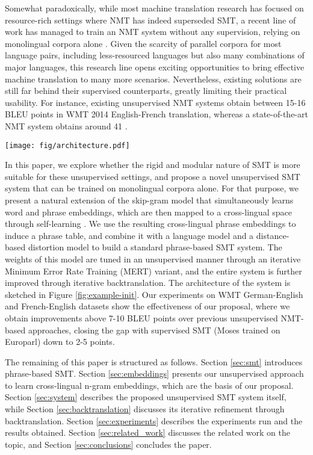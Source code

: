 \documentclass[11pt,a4paper]{article}
\begin{document}
Somewhat paradoxically, while most machine translation research has focused on resource-rich settings where NMT has indeed superseded SMT, a recent line of work has managed to train an NMT system without any supervision, relying on monolingual corpora alone \citep{artetxe2018unsupervised,lample2018unsupervised}. Given the scarcity of parallel corpora for most language pairs, including less-resourced languages but also many combinations of major languages, this research line opens exciting opportunities to bring effective machine translation to many more scenarios. Nevertheless, existing solutions are still far behind their supervised counterparts, greatly limiting their practical usability. For instance, existing unsupervised NMT systems obtain between 15-16 BLEU points in WMT 2014 English-French translation, whereas a state-of-the-art NMT system obtains around 41 \citep{artetxe2018unsupervised,lample2018unsupervised,yang2018unsupervised}.

\begin{figure*}[t] \centering
\texttt{[image: fig/architecture.pdf]}
\caption{Architecture of our system, with references to sections.}
\label{fig:example-init}
\end{figure*}

In this paper, we explore whether the rigid and modular nature of SMT is more suitable for these unsupervised settings, and propose a novel unsupervised SMT system that can be trained on monolingual corpora alone. For that purpose, we present a natural extension of the skip-gram model \cite{mikolov2013distributed} that simultaneously learns word and phrase embeddings, which are then mapped to a cross-lingual space through self-learning \citep{artetxe2018robust}. We use the resulting cross-lingual phrase embeddings to induce a phrase table, and combine it with a language model and a distance-based distortion model to build a standard phrase-based SMT system. The weights of this model are tuned in an unsupervised manner through an iterative Minimum Error Rate Training (MERT) variant, and the entire system is further improved through iterative backtranslation. The architecture of the system is sketched in Figure \ref{fig:example-init}. Our experiments on WMT German-English and French-English datasets show the effectiveness of our proposal, where we obtain improvements above 7-10 BLEU points over previous unsupervised NMT-based approaches, closing the gap with supervised SMT (Moses trained on Europarl) down to 2-5 points.

The remaining of this paper is structured as follows. Section \ref{sec:smt} introduces phrase-based SMT. Section \ref{sec:embeddings} presents our unsupervised approach to learn cross-lingual n-gram embeddings, which are the basis of our proposal. Section \ref{sec:system} describes the proposed unsupervised SMT system itself, while Section \ref{sec:backtranslation} discusses its iterative refinement through backtranslation. Section \ref{sec:experiments} describes the experiments run and the results obtained. Section \ref{sec:related_work} discusses the related work on the topic, and Section \ref{sec:conclusions} concludes the paper.
\end{document}
